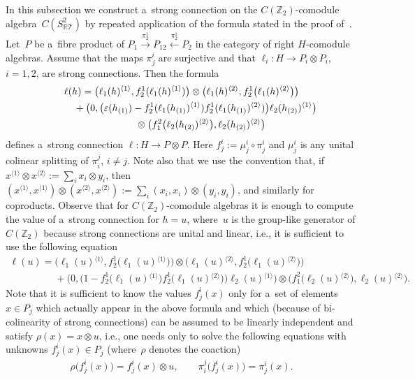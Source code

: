 \documentclass[pdftex]{sigma}
\def\sw#1{{\sb{(#1)}}}
\begin{document}
In this subsection we construct a~strong connection on the $C({\mathbb Z_2})$-comodule
algebra~${C(S^2_{\mathbb{R}\mathcal{T}})}$ by repeated application of the formula stated in the proof of~\cite[Lemma~3.2]{hkmz11}.
Let~$P$ be a~f\/ibre product of $P_1\stackrel{\pi^1_2}{\longrightarrow}P_{12}\stackrel{\pi^1_2}{\longleftarrow}P_2$ in the
category of right $H$-comodule algebras.
Assume that the maps $\pi^i_j$ are surjective and that $\ell_i:H\rightarrow P_i\otimes P_i$, $i=1,2$, are strong connections.
Then the formula \cite[Lemma~3.2]{hkmz11}
\begin{gather}
\ell(h) =\big(\ell_1(h){}^{\langle 1\rangle},f^1_2(\ell_1(h){}^{\langle
1\rangle})\big)\otimes\big(\ell_1(h){}^{\langle 2\rangle},f^1_2\big(\ell_1(h){}^{\langle 2\rangle}\big)\big)
\nonumber
\\
\phantom{\ell(h) =}
{}+\big(0,\big(\varepsilon(h\sw{1})-f^1_2(\ell_1(h\sw{1}){}^{\langle 1\rangle})f^1_2(\ell_1(h\sw{1}){}^{\langle
2\rangle})\big)
\ell_2(h\sw{2}){}^{\langle 1\rangle} \big)
\nonumber
\\
\phantom{\ell(h) =+}{}
\otimes\big(f^2_1\big(\ell_2(h\sw{2}){}^{\langle 2\rangle}\big),\ell_2(h\sw{2}){}^{\langle 2\rangle}\big)
\label{stronglue}
\end{gather}
def\/ines a~strong connection $\ell:H\rightarrow P\otimes P$.
Here $f^i_j:=\mu_j^i\circ\pi^i_j$ and $\mu_j^i$ is any unital colinear splitting of $\pi^j_i$, $i\neq j$.
Note also that we use the convention that, if $x{}^{\langle 1\rangle}\otimes x{}^{\langle
2\rangle}:=\sum\limits_ix_i\otimes y_i$, then $(x{}^{\langle 1\rangle},x{}^{\langle 1\rangle})\otimes (x{}^{\langle
2\rangle},x{}^{\langle 2\rangle}):=\sum\limits_i(x_i,x_i)\otimes (y_i,y_i)$, and similarly for coproducts.
Observe that for $C({\mathbb Z_2})$-comodule algebras it is enough to compute the value of a~strong connection for
$h=u$, where~$u$ is the group-like generator of $C({\mathbb Z_2})$ because strong connections are unital and linear,
i.e., it is suf\/f\/icient to use the following equation
\begin{gather}
\ell(u) =\big(\ell_1(u){}^{\langle 1\rangle},f^1_2\big(\ell_1(u){}^{\langle
1\rangle}\big)\big)\otimes\big(\ell_1(u){}^{\langle 2\rangle},f^1_2\big(\ell_1(u){}^{\langle 2\rangle}\big)\big)
\nonumber
\\
\phantom{\ell(u) =}
{}+\big(0,\big(1-f^1_2\big(\ell_1(u){}^{\langle 1\rangle}\big)f^1_2\big(\ell_1(u){}^{\langle 2\rangle}\big)\big)
\ell_2(u){}^{\langle 1\rangle} \big)\otimes\big(f^2_1\big(\ell_2(u){}^{\langle 2\rangle}\big),\ell_2(u){}^{\langle 2\rangle}\big).
\label{stronglue2}
\end{gather}
Note that it is suf\/f\/icient to know the values $f^i_j(x)$ only for a~set of elements $x\in P_j$ which actually appear in
the above formula and which (because of bi-colinearity of strong connections) can be assumed to be linearly independent
and satisfy $\rho(x)=x\otimes u$, i.e., one needs only to solve the following equations with unknowns $f^i_j(x)\in P_j$
(where~$\rho$ denotes the coaction)
\begin{gather}
\label{fijeqsys}
\rho\big(f^i_j(x)\big)=f^i_j(x)\otimes u,
\qquad
\pi^j_i\big(f^i_j(x)\big)=\pi^i_j(x).
\end{gather}
\end{document}
